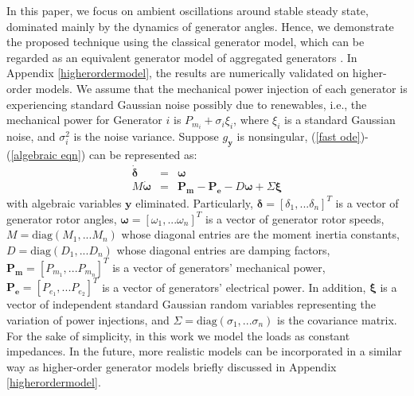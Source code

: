 \documentclass[journal]{IEEEtran}
\begin{document}
In this paper, we focus on ambient oscillations around stable steady state, dominated mainly by the dynamics of generator angles. Hence, we demonstrate the proposed technique using the classical generator model, which can be regarded as an equivalent generator model of aggregated generators \cite{Chow:2014}. In Appendix \ref{higherordermodel}, the results are numerically validated on higher-order models.
We assume that the mechanical power injection of each generator is experiencing standard Gaussian noise possibly due to renewables, i.e., the mechanical power for Generator $i$ is $P_{m_i}+\sigma_i\xi_i$, where $\xi_i$ is a standard Gaussian noise, and $\sigma_i^2$ is the noise variance.
Suppose $g_{\bm{y}}$ is nonsingular, (\ref{fast ode})-(\ref{algebraic eqn}) can be represented as:
\begin{eqnarray}
\dot{\bm{\delta}}&=&\bm{\omega}\label{swing-1}\\
M\dot{\bm{\omega}}&=&\bm{P_m}-\bm{P_e}-{D}\bm{\omega}+{\Sigma}\bm{\xi}\label{swing-2}
\end{eqnarray}
with algebraic variables $\bm{y}$ eliminated. Particularly, $\bm{\delta}=[\delta_1,...\delta_n]^T$ is a vector of generator rotor angles, $\bm{\omega}=[\omega_1,...\omega_n]^T$ is a vector of generator rotor speeds, $M=\mbox{diag}(M_1,...M_n)$ whose diagonal entries are the moment inertia constants, $D=\mbox{diag}(D_1,...D_n)$ whose diagonal entries are damping factors, $\bm{P_m}=[P_{m_1},...P_{m_n}]^T$ is a vector of generators' mechanical power, $\bm{P_e}=[P_{e_1},...P_{e_2}]^T$ is a vector of generators' electrical power. In addition, $\bm{{\xi}}$ is a vector of independent standard Gaussian random variables representing the variation of power injections, and $\Sigma=\mbox{diag}(\sigma_1,...\sigma_n)$ is the covariance matrix.
For the sake of simplicity, in this work we model the loads as constant impedances. In the future, more realistic models can be incorporated in a similar way as higher-order generator models briefly discussed in Appendix \ref{higherordermodel}.
\end{document}
